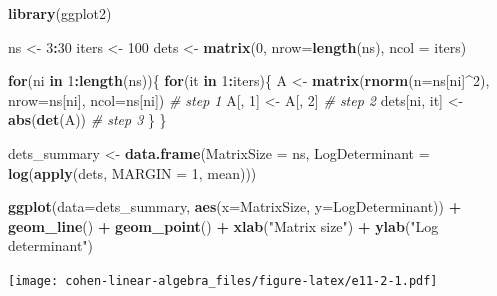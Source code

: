 \documentclass[
]{book}
\newenvironment{Shaded}{\begin{snugshade}}{\end{snugshade}}
\newcommand{\CommentTok}[1]{\textcolor[rgb]{0.56,0.35,0.01}{\textit{#1}}}
\newcommand{\ControlFlowTok}[1]{\textcolor[rgb]{0.13,0.29,0.53}{\textbf{#1}}}
\newcommand{\DataTypeTok}[1]{\textcolor[rgb]{0.13,0.29,0.53}{#1}}
\newcommand{\DecValTok}[1]{\textcolor[rgb]{0.00,0.00,0.81}{#1}}
\newcommand{\KeywordTok}[1]{\textcolor[rgb]{0.13,0.29,0.53}{\textbf{#1}}}
\newcommand{\NormalTok}[1]{#1}
\newcommand{\OperatorTok}[1]{\textcolor[rgb]{0.81,0.36,0.00}{\textbf{#1}}}
\newcommand{\StringTok}[1]{\textcolor[rgb]{0.31,0.60,0.02}{#1}}
\begin{document}
\begin{Shaded}
\begin{Highlighting}[]
\KeywordTok{library}\NormalTok{(ggplot2)}

\NormalTok{ns \textless{}{-}}\StringTok{ }\DecValTok{3}\OperatorTok{:}\DecValTok{30}
\NormalTok{iters \textless{}{-}}\StringTok{ }\DecValTok{100}
\NormalTok{dets \textless{}{-}}\StringTok{ }\KeywordTok{matrix}\NormalTok{(}\DecValTok{0}\NormalTok{, }\DataTypeTok{nrow=}\KeywordTok{length}\NormalTok{(ns), }\DataTypeTok{ncol =}\NormalTok{ iters)}

\ControlFlowTok{for}\NormalTok{(ni }\ControlFlowTok{in} \DecValTok{1}\OperatorTok{:}\KeywordTok{length}\NormalTok{(ns))\{}
  \ControlFlowTok{for}\NormalTok{(it }\ControlFlowTok{in} \DecValTok{1}\OperatorTok{:}\NormalTok{iters)\{}
\NormalTok{    A \textless{}{-}}\StringTok{ }\KeywordTok{matrix}\NormalTok{(}\KeywordTok{rnorm}\NormalTok{(}\DataTypeTok{n=}\NormalTok{ns[ni]}\OperatorTok{\^{}}\DecValTok{2}\NormalTok{), }\DataTypeTok{nrow=}\NormalTok{ns[ni], }\DataTypeTok{ncol=}\NormalTok{ns[ni]) }\CommentTok{\# step 1}
\NormalTok{    A[, }\DecValTok{1}\NormalTok{] \textless{}{-}}\StringTok{ }\NormalTok{A[, }\DecValTok{2}\NormalTok{]  }\CommentTok{\# step 2  }
\NormalTok{    dets[ni, it] \textless{}{-}}\StringTok{ }\KeywordTok{abs}\NormalTok{(}\KeywordTok{det}\NormalTok{(A)) }\CommentTok{\# step 3}
\NormalTok{  \}}
\NormalTok{\}}

\NormalTok{dets\_summary \textless{}{-}}\StringTok{ }
\StringTok{  }\KeywordTok{data.frame}\NormalTok{(}\DataTypeTok{MatrixSize =}\NormalTok{ ns,}
             \DataTypeTok{LogDeterminant =} \KeywordTok{log}\NormalTok{(}\KeywordTok{apply}\NormalTok{(dets, }\DataTypeTok{MARGIN =} \DecValTok{1}\NormalTok{, mean)))}

\KeywordTok{ggplot}\NormalTok{(}\DataTypeTok{data=}\NormalTok{dets\_summary, }\KeywordTok{aes}\NormalTok{(}\DataTypeTok{x=}\NormalTok{MatrixSize, }\DataTypeTok{y=}\NormalTok{LogDeterminant)) }\OperatorTok{+}\StringTok{ }
\StringTok{  }\KeywordTok{geom\_line}\NormalTok{() }\OperatorTok{+}\StringTok{ }
\StringTok{  }\KeywordTok{geom\_point}\NormalTok{() }\OperatorTok{+}\StringTok{ }
\StringTok{  }\KeywordTok{xlab}\NormalTok{(}\StringTok{"Matrix size"}\NormalTok{) }\OperatorTok{+}\StringTok{ }
\StringTok{  }\KeywordTok{ylab}\NormalTok{(}\StringTok{"Log determinant"}\NormalTok{)}
\end{Highlighting}
\end{Shaded}

\texttt{[image: cohen-linear-algebra\_files/figure-latex/e11-2-1.pdf]}
\end{document}
